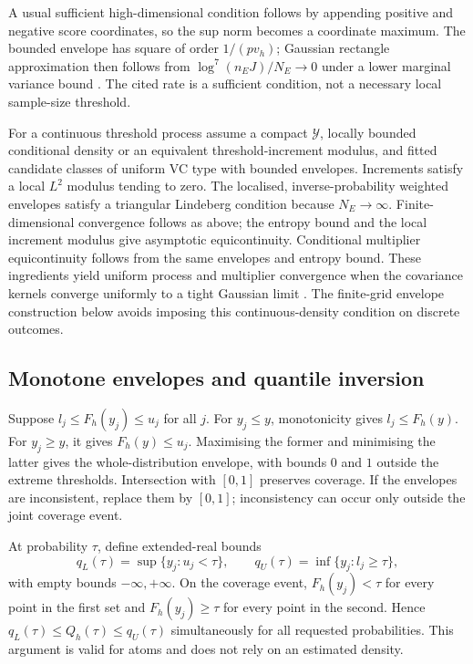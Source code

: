 A usual sufficient high-dimensional condition follows by appending positive and negative score coordinates, so the sup norm becomes a coordinate maximum. The bounded envelope has square of order $1/(pv_h)$; Gaussian rectangle approximation then follows from $\log^7(n_EJ)/N_E\to0$ under a lower marginal variance bound \citep{cck2016clt}. The cited rate is a sufficient condition, not a necessary local sample-size threshold.

For a continuous threshold process assume a compact $\mathcal Y$, locally bounded conditional density or an equivalent threshold-increment modulus, and fitted candidate classes of uniform VC type with bounded envelopes. Increments satisfy a local $L^2$ modulus tending to zero. The localised, inverse-probability weighted envelopes satisfy a triangular Lindeberg condition because $N_E\to\infty$. Finite-dimensional convergence follows as above; the entropy bound and the local increment modulus give asymptotic equicontinuity. Conditional multiplier equicontinuity follows from the same envelopes and entropy bound. These ingredients yield uniform process and multiplier convergence when the covariance kernels converge uniformly to a tight Gaussian limit \citep{VanderVaartWellner1996,cck2015empirical}. The finite-grid envelope construction below avoids imposing this continuous-density condition on discrete outcomes.

\subsection{Monotone envelopes and quantile inversion}
Suppose $l_j\leq F_h(y_j)\leq u_j$ for all $j$. For $y_j\leq y$, monotonicity gives $l_j\leq F_h(y)$. For $y_j\geq y$, it gives $F_h(y)\leq u_j$. Maximising the former and minimising the latter gives the whole-distribution envelope, with bounds $0$ and $1$ outside the extreme thresholds. Intersection with $[0,1]$ preserves coverage. If the envelopes are inconsistent, replace them by $[0,1]$; inconsistency can occur only outside the joint coverage event.

At probability $\tau$, define extended-real bounds
\[
 q_L(\tau)=\sup\{y_j:u_j<\tau\},\qquad
 q_U(\tau)=\inf\{y_j:l_j\geq\tau\},
\]
with empty bounds $-\infty,+\infty$. On the coverage event, $F_h(y_j)<\tau$ for every point in the first set and $F_h(y_j)\geq\tau$ for every point in the second. Hence
$q_L(\tau)\leq Q_h(\tau)\leq q_U(\tau)$ simultaneously for all requested probabilities. This argument is valid for atoms and does not rely on an estimated density.

